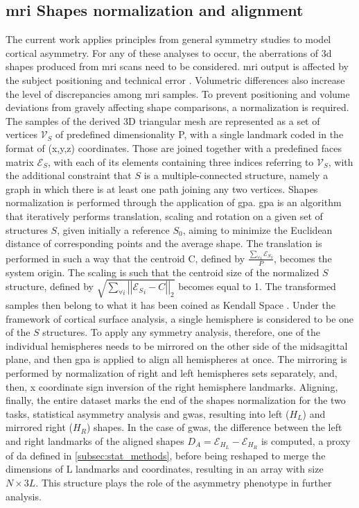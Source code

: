 \subsection{\Ac{mri} Shapes normalization and alignment}\label{subsec:shape_normalization}
The current work applies principles from general symmetry studies to model cortical asymmetry. For any of these analyses to occur, the aberrations of \ac{3d} shapes produced from \ac{mri} scans need to be considered. \Ac{mri} output is affected by the subject positioning and technical error \cite{Wittens2021}.  Volumetric differences also increase the level of discrepancies among \ac{mri} samples.  To prevent positioning and volume deviations from gravely affecting shape comparisons, a normalization is required\cite{Klingenberg2020}. The samples of the derived 3D triangular mesh are represented as a set of vertices $\mathcal{V}_S$ of predefined dimensionality P, with a single landmark coded in the format of (x,y,z) coordinates. Those are joined together with a predefined faces matrix $\mathcal{E}_S$, with each of its elements containing three indices referring to $\mathcal{V}_S$, with the additional constraint that $S$ is a multiple-connected structure, namely a graph in which there is at least one path joining any two vertices. Shapes normalization is performed through the application of \ac{gpa}. \Ac{gpa} is an algorithm that iteratively performs translation, scaling and rotation on a given set of structures $S$, given initially a reference $S_0$, aiming to minimize the Euclidean distance of corresponding points and the average shape. The translation is performed in such a way that the centroid C, defined by $\frac{\sum_{\forall i}{\mathcal{E}_S}_i}{P}$, becomes the system origin. The scaling is such that the centroid size of the normalized $S$ structure, defined by $\sqrt{\sum_{\forall i}{\left|\left|{\mathcal{E}_S}_i-C\right|\right|_2}}$ becomes equal to 1. The transformed samples then belong to what it has been coined as Kendall Space \cite{Klingenberg2020}.  Under the framework of cortical surface analysis, a single hemisphere is considered to be one of the $S$ structures. To apply any symmetry analysis, therefore, one of the individual hemispheres needs to be mirrored on the other side of the midsagittal plane, and then \ac{gpa} is applied to align all hemispheres at once. The mirroring is performed by normalization of right and left hemispheres sets separately, and, then, x coordinate sign inversion of the right hemisphere landmarks. Aligning, finally, the entire dataset marks the end of the shapes normalization for the two tasks, statistical asymmetry analysis and \ac{gwas}, resulting into left ($H_L$) and mirrored right ($H_R$) shapes. In the case of \ac{gwas}, the difference between the left and right landmarks of the aligned shapes $D_A=\mathcal{E}_{H_L}-\mathcal{E}_{H_R}$ is computed, a proxy of \ac{da} defined in \autoref{subsec:stat_methods}, before being reshaped to merge the dimensions of L landmarks and coordinates, resulting in an array with size $N\times3L$. This structure plays the role of the asymmetry phenotype in further analysis. 

